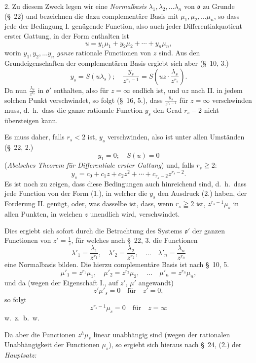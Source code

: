 \documentclass{article}
\begin{document}
2. Zu diesem Zweck legen wir eine \emph{Normalbasis} $\lambda_{1}, \lambda_{2}, \ldots \lambda_{n}$ von $\mathfrak{o}$ zu Grunde (§~22) und bezeichnen die dazu complementäre Basis mit $\mu_{1}, \mu_{2}, \ldots \mu_{n}$, so dass jede der Bedingung I. genügende Function, also auch jeder Differentialquotient erster Gattung, in der Form enthalten ist
\[ u = y_{1}\mu_{1} + y_{2}\mu_{2} + \cdots + y_{n}\mu_{n}, \tag{1.} \]
worin $y_{1}, y_{2}, \ldots y_{n}$ \emph{ganze} rationale Functionen von $z$ sind. Aus den Grundeigenschaften der complementären Basis ergiebt sich aber (§~10, 3.)
\[ y_{s} = S(u\lambda_{s}); \quad \frac{y_{s}}{z^{r_{s}-1}} = S\left(uz\cdot\frac{\lambda_{s}}{z^{r_{s}}}\right). \]
Da nun $\frac{\lambda_{s}}{z^{r_{s}}}$ in $\mathfrak{o}'$ enthalten, also für $z = \infty$ endlich ist, und $uz$ nach II. in jedem solchen Punkt verschwindet, so folgt (§~16, 5.), dass $\frac{y_{s}}{z^{r_{s}-1}}$ für $z = \infty$ verschwinden muss, d.\ h.\ dass die ganze rationale Function $y_{s}$ den Grad $r_{s}-2$ nicht übersteigen kann.

Es muss daher, falls $r_{s} < 2$ ist, $y_{s}$ verschwinden, also ist unter allen Umständen (§~22, 2.)
\[ y_{1} = 0; \quad S(u) = 0 \]
(\emph{Abelsches Theorem für Differentiale erster Gattung}) und, falls $r_{s} \geqq 2$:
\[ y_{s} = c_{0} + c_{1}z + c_{2}z^{2} + \cdots + c_{r_{s}-2}z^{r_{s}-2}. \tag{2.} \]
Es ist noch zu zeigen, dass diese Bedingungen auch hinreichend sind, d.\ h.\ dass jede Function von der Form (1.), in welcher die $y_{s}$ den Ausdruck (2.) haben, der Forderung II. genügt, oder, was dasselbe ist, dass, wenn $r_{s} \geqq 2$ ist, $z^{r_{s}-1}\mu_{s}$ in allen Punkten, in welchen $z$ unendlich wird, verschwindet.

Dies ergiebt sich sofort durch die Betrachtung des Systems $\mathfrak{o}'$ der ganzen Functionen von $z' = \frac{1}{z}$, für welches nach §~22, 3. die Functionen
\[ \lambda'_{1} = \frac{\lambda_{1}}{z^{r_{1}}}, \quad \lambda'_{2} = \frac{\lambda_{2}}{z^{r_{2}}}, \quad \ldots \quad \lambda'_{n} = \frac{\lambda_{n}}{z^{r_{n}}} \]
eine Normalbasis bilden. Die hierzu complementäre Basis ist nach §~10, 5.
\[ \mu'_{1} = z^{r_{1}}\mu_{1}, \quad \mu'_{2} = z^{r_{2}}\mu_{2}, \quad \ldots \quad \mu'_{n} = z^{r_{n}}\mu_{n}, \]
und da (wegen der Eigenschaft I., auf $z'$, $\mu'$ angewandt)
\[ z'\mu'_{s} = 0 \quad \text{für} \quad z' = 0, \]
so folgt
\[ z^{r_{s}-1}\mu_{s} = 0 \quad \text{für} \quad z = \infty \]
w.\ z.\ b.\ w.

Da aber die Functionen $z^{h}\mu_{s}$ linear unabhängig sind (wegen der rationalen Unabhängigkeit der Functionen $\mu_{s}$), so ergiebt sich hieraus nach §~24, (2.) der \emph{Hauptsatz:}
\end{document}
